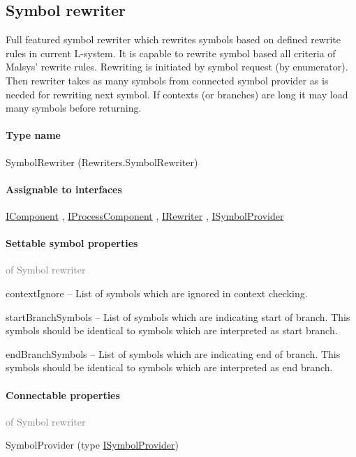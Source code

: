 
\subsection{Symbol rewriter}
\label{Malsys.Processing.Components.Rewriters.SymbolRewriter}
Full featured symbol rewriter which rewrites symbols based on defined rewrite rules in current L-system.
            It is capable to rewrite symbol based all criteria of Malsys' rewrite rules.
            Rewriting is initiated by symbol request (by enumerator).
            Then rewriter takes as many symbols from connected symbol provider as is needed for rewriting next symbol.
            If contexts (or branches) are long it may load many symbols before returning.\paragraph{Type name}
SymbolRewriter (Rewriters.SymbolRewriter) 	\paragraph{Assignable to interfaces}
		\hyperref[Malsys.Processing.Components.IComponent]{IComponent}%
, 		\hyperref[Malsys.Processing.Components.IProcessComponent]{IProcessComponent}%
, 		\hyperref[Malsys.Processing.Components.IRewriter]{IRewriter}%
, 		\hyperref[Malsys.Processing.Components.ISymbolProvider]{ISymbolProvider}%
	\paragraph{Settable symbol properties}\textcolor{gray}{of Symbol rewriter}
	\begin{description*}
		\item[contextIgnore]
			-- List of symbols which are ignored in context checking.
		\item[startBranchSymbols]
			-- List of symbols which are indicating start of branch.
            This symbols should be identical to symbols which are interpreted as start branch.
		\item[endBranchSymbols]
			-- List of symbols which are indicating end of branch.
            This symbols should be identical to symbols which are interpreted as end branch.
	\end{description*}
	\paragraph{Connectable properties}\textcolor{gray}{of Symbol rewriter}
	\begin{description*}
		\item[SymbolProvider]
		(type \hyperref[Malsys.Processing.Components.ISymbolProvider]{ISymbolProvider})
	\end{description*}
	
